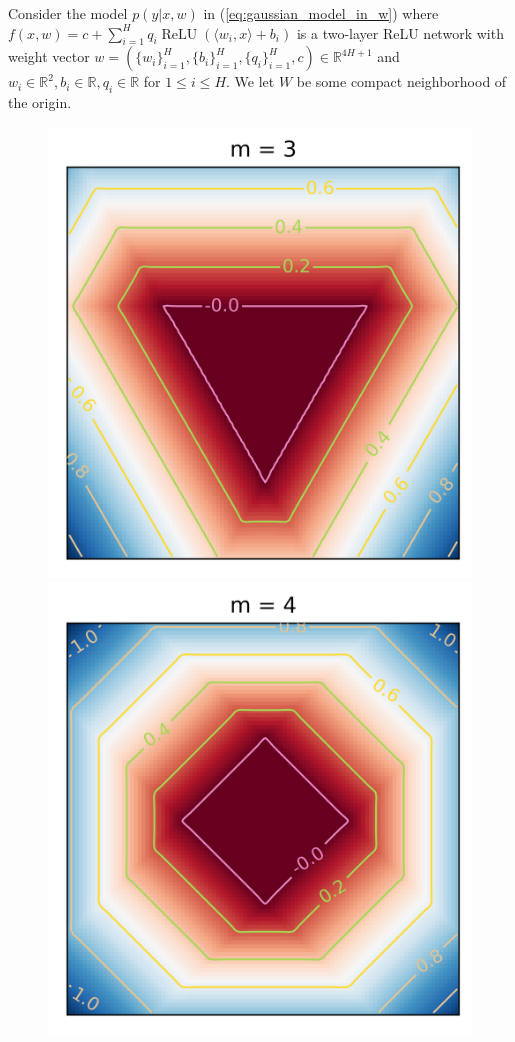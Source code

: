 \documentclass{article} %
\begin{document}
Consider the model $p(y|x,w)$ in (\ref{eq:gaussian_model_in_w}) where
$
f(x,w) = c + \sum_{i=1}^H q_i \operatorname{ReLU}( \langle w_i, x \rangle + b_i )
$
is a two-layer ReLU network with weight vector $w = (\{w_i\}_{i=1}^H, \{b_i\}_{i=1}^H, \{q_i\}_{i=1}^H, c) \in \mathbb{R}^{4H+1}$ and $w_i \in \mathbb{R}^2, b_i \in \mathbb{R}, q_i \in \mathbb{R}$ for $1 \le i \le H$. We let $W$ be some compact neighborhood of the origin.

\begin{figure}[h]
\begin{center}
\includegraphics[scale=0.35]{truedist3.png}
\includegraphics[scale=0.35]{truedist4.png}

\end{center}
\end{figure}
\end{document}
